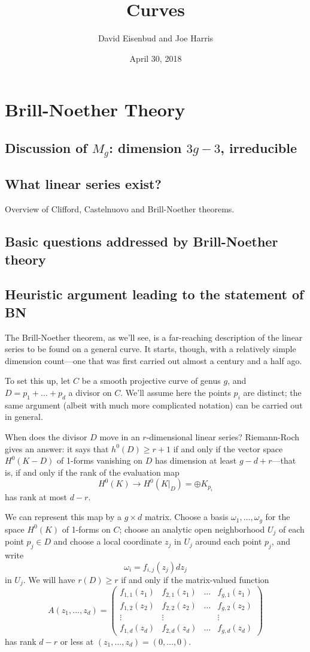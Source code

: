 \documentclass[12pt, leqno]{book}
\date{April 30, 2018}
\title{Curves}
\author{David Eisenbud and Joe Harris }
\begin{document}
\chapter{Brill-Noether Theory}

\section{Discussion of $M_g$: dimension $3g-3$, irreducible}

\section{What linear series exist?}

Overview of Clifford, Castelnuovo and Brill-Noether theorems.

\section{Basic questions addressed by Brill-Noether theory}

\section{Heuristic argument leading to the statement of BN}

The Brill-Noether theorem, as we'll see, is a far-reaching description of the linear series to be found on a general curve. It starts, though, with a relatively simple dimension count---one that was first carried out almost a century and a half ago.

To set this up, let $C$ be a smooth projective curve of genus $g$, and $D = p_1 + \dots + p_d$ a divisor on $C$. We'll assume here the points $p_i$ are distinct; the same argument (albeit with much more complicated notation) can be carried out in general.

When does the divisor $D$ move in an $r$-dimensional linear series? Riemann-Roch gives an answer: it says that $h^0(D) \geq r+1$ if and only if the vector space $H^0(K-D)$ of 1-forms vanishing on $D$ has dimension at least $g-d+r$---that is, if and only if the rank of the evaluation map
$$
H^0(K) \to H^0(K|_D) = \oplus K_{p_i}
$$
has rank at most $d-r$. 

We can represent this map by a $g \times d$ matrix. Choose a basis $\omega_1,\dots,\omega_g$ for the space $H^0(K)$ of 1-forms on $C$; choose an analytic open neighborhood $U_j$ of each point $p_j \in D$ and choose a local coordinate $z_j$ in $U_j$ around each point $p_j$, and write
$$
\omega_i = f_{i,j}(z_j)dz_j
$$
in $U_j$. We will have $r(D) \geq r$ if and only if the  matrix-valued function
$$
A(z_1,\dots,z_d) = 
\begin{pmatrix}
f_{1,1}(z_1) & f_{2,1}(z_1) & \dots & f_{g,1}(z_1) \\
f_{1,2}(z_2) & f_{2,2}(z_2) & \dots & f_{g,2}(z_2) \\
\vdots & \vdots &  & \vdots \\
f_{1,d}(z_d) & f_{2,d}(z_d) & \dots & f_{g,d} (z_d)
\end{pmatrix}
$$
has rank $d-r$ or less at $(z_1,\dots,z_d) = (0,\dots,0)$.
\end{document}

